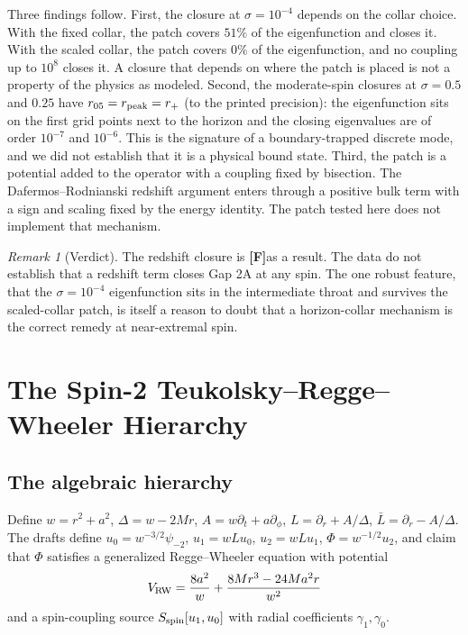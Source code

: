 \documentclass[11pt, a4paper]{article}
\newcommand{\FF}{\textcolor{ff}{\textbf{[F]}}}
\theoremstyle{remark}
\newtheorem{remark}[theorem]{Remark}
\theoremstyle{definition}
\begin{document}
Three findings follow. First, the closure at $\sigma = 10^{-4}$ depends on the collar choice. With the fixed collar, the patch covers $51\%$ of the eigenfunction and closes it. With the scaled collar, the patch covers $0\%$ of the eigenfunction, and no coupling up to $10^8$ closes it. A closure that depends on where the patch is placed is not a property of the physics as modeled. Second, the moderate-spin closures at $\sigma = 0.5$ and $0.25$ have $r_{05} = r_{\rm peak} = r_+$ (to the printed precision): the eigenfunction sits on the first grid points next to the horizon and the closing eigenvalues are of order $10^{-7}$ and $10^{-6}$. This is the signature of a boundary-trapped discrete mode, and we did not establish that it is a physical bound state. Third, the patch is a potential added to the operator with a coupling fixed by bisection. The Dafermos--Rodnianski redshift argument enters through a positive bulk term with a sign and scaling fixed by the energy identity. The patch tested here does not implement that mechanism.

\begin{remark}[Verdict]
The redshift closure is \FF as a result. The data do not establish that a redshift term closes Gap 2A at any spin. The one robust feature, that the $\sigma=10^{-4}$ eigenfunction sits in the intermediate throat and survives the scaled-collar patch, is itself a reason to doubt that a horizon-collar mechanism is the correct remedy at near-extremal spin.
\end{remark}

\section{The Spin-2 Teukolsky--Regge--Wheeler Hierarchy}
\label{sec:spin2}

\subsection{The algebraic hierarchy}

Define $w = r^2 + a^2$, $\Delta = w - 2Mr$, $A = w\partial_t + a\partial_\phi$, $L = \partial_r + A/\Delta$, $\bar L = \partial_r - A/\Delta$. The drafts define $u_0 = w^{-3/2}\psi_{-2}$, $u_1 = wLu_0$, $u_2 = wLu_1$, $\Phi = w^{-1/2}u_2$, and claim that $\Phi$ satisfies a generalized Regge--Wheeler equation with potential
\[
V_{\rm RW} = \frac{8a^2}{w} + \frac{8Mr^3 - 24Ma^2r}{w^2}
\]
and a spin-coupling source $S_{\rm spin}[u_1,u_0]$ with radial coefficients $\gamma_1,\gamma_0$.
\end{document}
